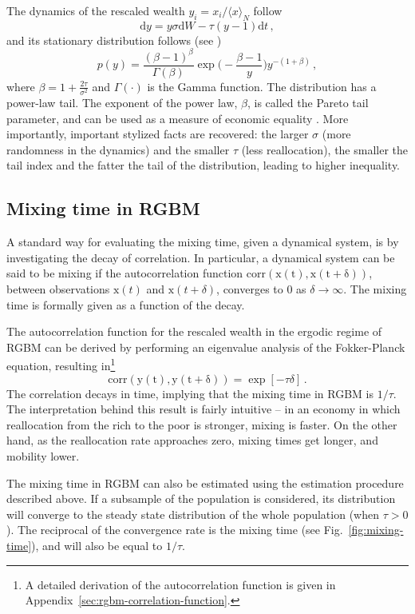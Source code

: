 \documentclass[11pt]{article}
\newcommand{\fref}[1]{Fig.~\ref{fig:#1}}
\newcommand{\be}{\begin{equation}}
\newcommand{\ee}{\end{equation}}
\numberwithin{equation}{section}
\begin{document}
The dynamics of the rescaled wealth $y_i = x_i / \langle x \rangle_N$ follow
%
\be
    \mathrm{d} y =   y \sigma  \mathrm{d} W - \tau (y - 1)  \mathrm{d}t\,,
    \label{eq:rescaled-rgbm}
\ee
%
and its stationary distribution follows (see \citep{BermanPetersAdamou2019})
%
\be
p(y) = \frac{(\beta - 1)^{\beta}}{\Gamma(\beta)} \exp{\big(-\frac{\beta - 1}{y}\big)} y^{-(1+\beta)}\,,
\label{eq:rgbm-stationary-distribution}
\ee
%
where $\beta = 1 + \frac{2 \tau}{\sigma^2}$ and $\Gamma(\cdot)$ is the Gamma function. The distribution has a power-law tail. The exponent of the power law, $\beta$, is called the Pareto tail parameter, and can be used as a measure of economic equality \citep{Cowell2011}. More importantly, important stylized facts are recovered: the larger $\sigma$ (more randomness in the dynamics) and the smaller $\tau$ (less reallocation), the smaller the tail index and the fatter the tail of the distribution, leading to higher inequality.

\subsection{Mixing time in RGBM}

A standard way for evaluating the mixing time, given a dynamical system, is by investigating the decay of correlation. In particular, a dynamical system can be said to be mixing if the autocorrelation function $\mathrm{corr(\mathrm{x}(t), \mathrm{x}(t+\delta))}$, between observations $\mathrm{x}(t)$ and $\mathrm{x}(t+\delta)$, converges to $0$ as $\delta \to \infty$. %
The mixing time is formally given as a function of the decay.

The autocorrelation function for the rescaled wealth in the ergodic regime of RGBM can be derived by performing an eigenvalue analysis of the Fokker-Planck equation, resulting in\footnote{A detailed derivation of the autocorrelation function is given in Appendix~\ref{sec:rgbm-correlation-function}.}
%
\be
\mathrm{corr(y(t), y(t+\delta))} = \exp\left[ -\tau \delta \right]\,.
\label{eq:rgbm-correlation}
\ee
%
The correlation decays in time, implying that the mixing time in RGBM is $1/\tau$. The interpretation behind this result is fairly intuitive -- in an economy in which reallocation from the rich to the poor is stronger, mixing is faster. On the other hand, as the reallocation rate approaches zero, mixing times get longer, and mobility lower.

The mixing time in RGBM can also be estimated using the estimation procedure described above. If a subsample of the population is considered, its distribution will converge to the steady state distribution of the whole population (when $\tau > 0$). The reciprocal of the convergence rate is the mixing time (see \fref{mixing-time}), and will also be equal to $1/\tau$.
\end{document}

